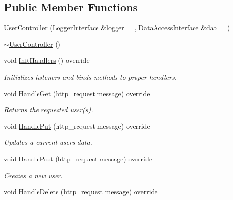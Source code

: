 \subsection*{Public Member Functions}
\begin{DoxyCompactItemize}
\item 
\mbox{\hyperlink{classcadg__rest_1_1_user_controller_a0163192955de3f5484fceaf7796fd881}{User\+Controller}} (\mbox{\hyperlink{classcadg__rest_1_1_logger_interface}{Logger\+Interface}} \&\mbox{\hyperlink{classcadg__rest_1_1_controller_a5eebad0222becb1157f8dd7b9e978c37}{logger\+\_\+\+\_\+}}, \mbox{\hyperlink{classcadg__rest_1_1_data_access_interface}{Data\+Access\+Interface}} \&dao\+\_\+\+\_\+)
\item 
\mbox{\hyperlink{classcadg__rest_1_1_user_controller_a50fe3192b76a765abdcda0f4a9cbc20b}{$\sim$\+User\+Controller}} ()
\item 
void \mbox{\hyperlink{classcadg__rest_1_1_user_controller_a213210b1e1f8f7417133f3290fbb9b67}{Init\+Handlers}} () override
\begin{DoxyCompactList}\small\item\em Initializes listeners and binds methods to proper handlers. \end{DoxyCompactList}\item 
void \mbox{\hyperlink{classcadg__rest_1_1_user_controller_ae31aee8fecf0d1f7d0ba70c0e62da54d}{Handle\+Get}} (http\+\_\+request message) override
\begin{DoxyCompactList}\small\item\em Returns the requested user(s). \end{DoxyCompactList}\item 
void \mbox{\hyperlink{classcadg__rest_1_1_user_controller_a5da4d0addb0504184929a57d7f196c79}{Handle\+Put}} (http\+\_\+request message) override
\begin{DoxyCompactList}\small\item\em Updates a current user\textquotesingle{}s data. \end{DoxyCompactList}\item 
void \mbox{\hyperlink{classcadg__rest_1_1_user_controller_a6c3307f7b6fd4dc0b697bc956503e478}{Handle\+Post}} (http\+\_\+request message) override
\begin{DoxyCompactList}\small\item\em Creates a new user. \end{DoxyCompactList}\item 
void \mbox{\hyperlink{classcadg__rest_1_1_user_controller_a99ed4e9459766b3e000814b503378a2d}{Handle\+Delete}} (http\+\_\+request message) override

\end{DoxyCompactItemize}
